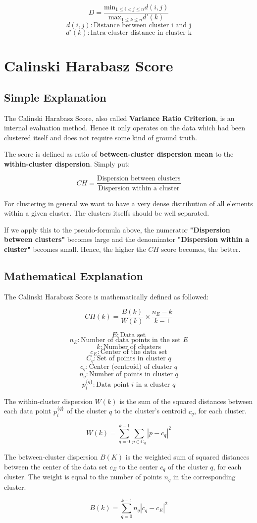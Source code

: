 $$ D = \frac{ \text{min}_{1\leq i < j\leq n} d(i,j) }{ \text{max}_{1 \leq k \leq n} d'(k) } $$
$$ d(i,j) : \text{Distance between cluster i and j}$$
$$d'(k) : \text{Intra-cluster distance in cluster k}$$


\clearpage
\section{Calinski Harabasz Score}
\subsection{Simple Explanation}


The Calinski Harabasz Score, also called \textbf{Variance Ratio Criterion}, is an internal evaluation method. Hence it only operates on the data which had been clustered itself and does not require some kind of ground truth. 


The score is defined as ratio of \textbf{between-cluster dispersion mean} to the \textbf{within-cluster dispersion}.
Simply put:

$$ CH = \frac{\text{Dispersion between clusters}}{\text{Dispersion within a cluster}}  $$

For clustering in general we want to have a very dense distribution of all elements within a given cluster. The clusters itselfs should be well separated.

If we apply this to the pseudo-formula above, the numerator \textbf{"Dispersion between clusters"} becomes large and the denominator \textbf{"Dispersion within a cluster"} becomes small. Hence, the higher the $CH$ score becomes, the better. 



\clearpage
\subsection{Mathematical Explanation}

The Calinski Harabasz Score is mathematically defined as followed:


$$ CH(k) = \frac{B(k)}{W(k)} \times \frac{n_{E} - k}{k - 1} $$

$$ E : \text{Data set} $$
$$ n_{E} : \text{Number of data points in the set } E $$
$$ k : \text{Number of clusters} $$
$$ c_{E} : \text{Center of the data set} $$
$$ C_{q} : \text{Set of points in cluster } q $$
$$ c_{q} : \text{Center (centroid) of cluster } q $$
$$ n_{q} : \text{Number of points in cluster } q $$
$$p_{i}^{\{q\}} : \text{Data point } i \text{ in a cluster } q $$

The within-cluster dispersion $W(k)$ is the sum of the squared distances between each data point $p_{i}^{\{q\}}$ of the cluster $q$ to the cluster's centroid $c_{q}$, for each cluster.

$$ W(k) = \sum_{q=0}^{k-1} \sum_{p \in C_{q}} |p - c_{q}|^{2} $$


The between-cluster dispersion $B(K)$ is the weighted sum of squared distances between the center of the data set $c_{E}$ to the center $c_{q}$ of the cluster $q$, for each cluster. The weight is equal to the number of points $n_{q}$ in the corresponding cluster.


$$ B(k) = \sum_{q = 0}^{k - 1} n_{q} |c_{q} - c_{E}|^{2} $$